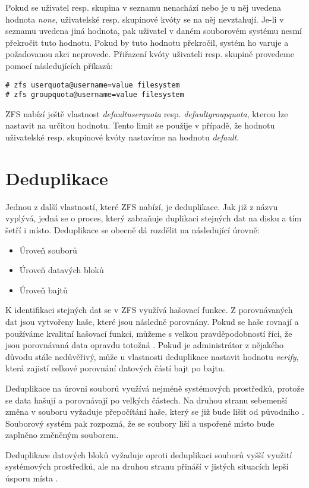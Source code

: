 Pokud se uživatel resp. skupina v seznamu nenachází nebo je u něj uvedena hodnota \emph{none}, uživatelské resp. skupinové kvóty se na něj nevztahují. Je-li v seznamu uvedena jiná hodnota, pak uživatel v daném souborovém systému nesmí překročit tuto hodnotu. Pokud by tuto hodnotu překročil, systém ho varuje a požadovanou akci neprovede. Přiřazení kvóty uživateli resp. skupině provedeme pomocí následujících příkazů:
\begin{verbatim}
# zfs userquota@username=value filesystem
# zfs groupquota@username=value filesystem
\end{verbatim}

ZFS nabízí ještě vlastnost \emph{defaultuserquota} resp. \emph{defaultgroupquota}, kterou lze nastavit na určitou hodnotu. Tento limit se použije v případě, že hodnotu uživatelské resp. skupinové kvóty nastavíme na hodnotu \emph{default}.
\section{Deduplikace}
\label{dedup}
Jednou z další vlastností, které ZFS nabízí, je deduplikace. Jak již z názvu vyplývá, jedná se o proces, který zabraňuje duplikaci stejných dat na disku a tím šetří i místo. Deduplikace se obecně dá rozdělit na následující úrovně:
\begin{itemize}
  \item Úroveň souborů
  \item Úroveň datavých bloků
  \item Úroveň bajtů
\end{itemize}

K identifikaci stejných dat se v ZFS využívá hašovací funkce. Z porovnávaných dat jsou vytvořeny haše, které jsou následně porovnány. Pokud se haše rovnají a používáme kvalitní hašovací funkci, můžeme s velkou pravděpodobností říci, že jsou porovnávaná data opravdu totožná \cite{dedup}. Pokud je administrátor z nějakého důvodu stále nedůvěřivý, může u vlastnosti deduplikace nastavit hodnotu \emph{verify}, která zajistí celkové porovnání datových částí bajt po bajtu.

Deduplikace na úrovni souborů využívá nejméně systémových prostředků, protože se data hašují a porovnávají po velkých částech. Na druhou stranu sebemenší změna v souboru vyžaduje přepočítání haše, který se již bude lišit od původního \cite{dedup}. Souborový systém pak rozpozná, že se soubory liší a uspořené místo bude zaplněno změněným souborem.

Deduplikace datových bloků vyžaduje oproti deduplikaci souborů vyšší využití systémových prostředků, ale na druhou stranu přináší v jistých situacích lepší úsporu místa \cite{dedup}.


